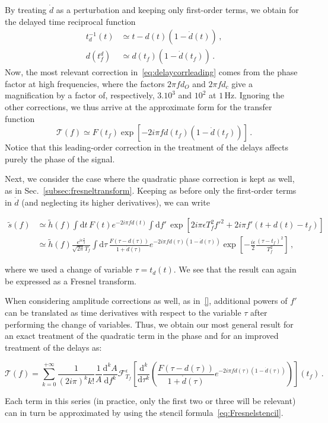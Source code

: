 \documentclass[aps,showpacs,twocolumn,
prd,superscriptaddress,nofootinbib]{revtex4-1}
\newcommand{\be}{\begin{equation}}
\newcommand{\ee}{\end{equation}}
\newcommand\ud{{\mathrm{d}}}
\newcommand\calF{{\mathcal{F}}}
\newcommand\calT{{\mathcal{T}}}
\newcommand{\nn}{\nonumber}
\newcommand{\Hz}{\,\mathrm{Hz}}
\newcommand{\tf}{t_{f}}
\newcommand{\Tf}{T_{f}}
\begin{document}
By treating $\dot{d}$ as a perturbation and keeping only first-order terms, we obtain for the delayed time reciprocal function
\begin{align}
	t_{d}^{-1}(t) &\simeq t-d(t) (1-\dot{d}(t)) \,,\nn\\
	d(t_{f}^{d}) &\simeq d(t_{f}) ( 1 - \dot{d}(t_{f})) \,.
\end{align}
Now, the most relevant correction in~\eqref{eq:delaycorrleading} comes from the phase factor at high frequencies, where the factors $2\pi f d_{O}$ and $2\pi f d_{c}$ give a magnification by a factor of, respectively, $3.10^{3}$ and $10^{2}$ at $1\Hz$. Ignoring the other corrections, we thus arrive at the approximate form for the transfer function
\be
	\calT(f) \simeq F(t_{f})\exp\left[ -2i\pi f d(t_{f}) (1-\dot{d}(t_{f})) \right] \,.
\ee
Notice that this leading-order correction in the treatment of the delays affects purely the phase of the signal.

Next, we consider the case where the quadratic phase correction is kept as well, as in Sec.~\ref{subsec:fresneltransform}. Keeping as before only the first-order terms in $\dot{d}$ (and neglecting its higher derivatives), we can write
\begin{widetext}
\begin{align}
	\tilde{s}(f) &\simeq \tilde{h}(f) \int \ud t \, F(t) e^{-2i\pi f d(t)} \int \ud f' \, \exp\left[ 2i\pi \epsilon \Tf^{2} f'^{2} + 2i\pi f' (t+d(t) - \tf) \right] \nn\\
	&\simeq \tilde{h}(f) \frac{e^{i\epsilon\frac{\pi}{4}}}{\sqrt{2\pi}\Tf} \int \ud \tau \, \frac{F(\tau - d(\tau))}{1+\dot{d}(\tau)} e^{-2i\pi f d(\tau)(1-\dot{d}(\tau))}\exp\left[ -\frac{i\epsilon}{2} \frac{(\tau - \tf)^{2}}{\Tf^{2}} \right] \,,
\end{align}
\end{widetext}
where we used a change of variable $\tau = t_{d}(t)$. We see that the result can again be expressed as a Fresnel transform.

When considering amplitude corrections as well, as in~\eqref{}, additional powers of $f'$ can be translated as time derivatives with respect to the variable $\tau$ after performing the change of variables. Thus, we obtain our most general result for an exact treatment of the quadratic term in the phase and for an improved treatment of the delays as:
\begin{widetext}
\be\label{eq:transferfinal}
	\calT(f) = \sum\limits_{k=0}^{+\infty} \frac{1}{(2i\pi)^{k} k!} \frac{1}{A} \frac{\ud^{k}A}{\ud f^{k}}  \calF^{\epsilon}_{\Tf} \left[ \frac{\ud^{k}}{\ud \tau^{k}} \left( \frac{F(\tau - d(\tau))}{1+\dot{d}(\tau)} e^{-2i\pi f d(\tau)(1-\dot{d}(\tau))} \right) \right] (\tf) \,.
\ee
\end{widetext}
Each term in this series (in practice, only the first two or three will be relevant) can in turn be approximated by using the stencil formula~\eqref{eq:Fresnelstencil}.
\end{document}
